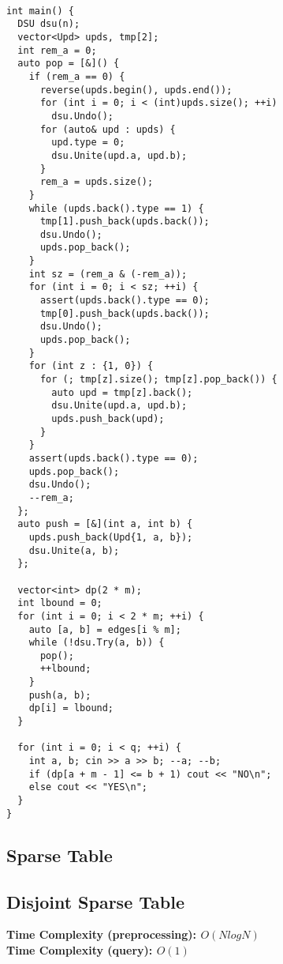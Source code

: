 \begin{minipage}[t]{0.45\linewidth}
\begin{lstlisting}

int main() {  
  DSU dsu(n);
  vector<Upd> upds, tmp[2];
  int rem_a = 0;
  auto pop = [&]() {
    if (rem_a == 0) {
      reverse(upds.begin(), upds.end());
      for (int i = 0; i < (int)upds.size(); ++i)
        dsu.Undo();
      for (auto& upd : upds) {
        upd.type = 0;
        dsu.Unite(upd.a, upd.b);
      }
      rem_a = upds.size();
    }
    while (upds.back().type == 1) {
      tmp[1].push_back(upds.back());
      dsu.Undo();
      upds.pop_back();
    }
    int sz = (rem_a & (-rem_a));
    for (int i = 0; i < sz; ++i) {
      assert(upds.back().type == 0);
      tmp[0].push_back(upds.back());
      dsu.Undo();
      upds.pop_back();
    }
    for (int z : {1, 0}) {
      for (; tmp[z].size(); tmp[z].pop_back()) {
        auto upd = tmp[z].back();
        dsu.Unite(upd.a, upd.b);
        upds.push_back(upd);
      }
    }
    assert(upds.back().type == 0);
    upds.pop_back();
    dsu.Undo();
    --rem_a;
  };
  auto push = [&](int a, int b) {
    upds.push_back(Upd{1, a, b});
    dsu.Unite(a, b);
  };
  
  vector<int> dp(2 * m);
  int lbound = 0;
  for (int i = 0; i < 2 * m; ++i) {
    auto [a, b] = edges[i % m];
    while (!dsu.Try(a, b)) {
      pop();
      ++lbound;
    }
    push(a, b);
    dp[i] = lbound;
  }
  
  for (int i = 0; i < q; ++i) {
    int a, b; cin >> a >> b; --a; --b;
    if (dp[a + m - 1] <= b + 1) cout << "NO\n";
    else cout << "YES\n";
  }
}
\end{lstlisting}
\end{minipage}

\subsection{Sparse Table}
\subsection{Disjoint Sparse Table}

\textbf{Time Complexity (preprocessing): $O(N log N)$}\\
\textbf{Time Complexity (query): $O(1)$}\\

